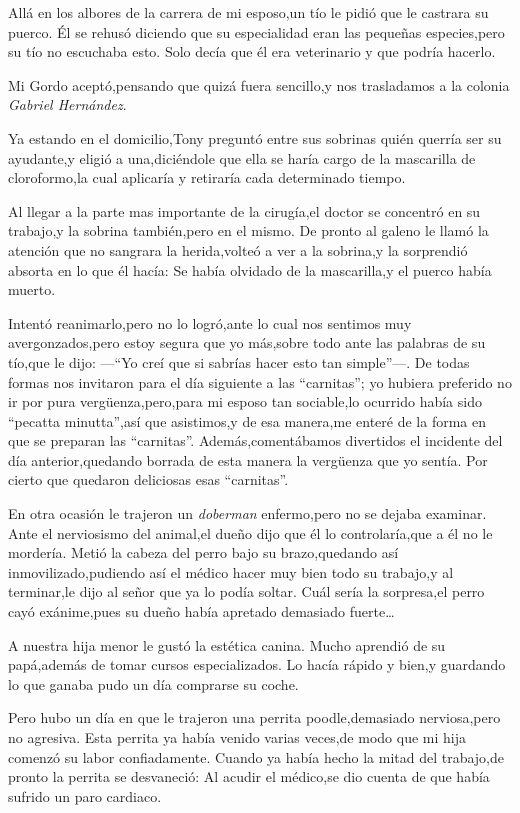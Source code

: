 \documentclass[letterpaper,12pt]{book}
\begin{document}
Allá en los albores de la carrera de mi esposo,un tío le pidió que le castrara su puerco. Él se rehusó diciendo que su especialidad eran las pequeñas especies,pero su tío no escuchaba esto. Solo decía que él era veterinario y que podría hacerlo.

Mi Gordo aceptó,pensando que quizá fuera sencillo,y nos trasladamos a la colonia {\it Gabriel Hernández}. 

Ya estando en el domicilio,Tony preguntó entre sus sobrinas quién querría ser su ayudante,y eligió a una,diciéndole que ella se haría cargo  de la mascarilla de cloroformo,la cual aplicaría y retiraría cada determinado tiempo.

Al llegar a la parte mas importante de la cirugía,el doctor se concentró en su trabajo,y la sobrina también,pero en el mismo. De pronto al galeno le llamó la atención que no sangrara la herida,volteó a ver a la sobrina,y la sorprendió absorta en lo que él hacía: Se había olvidado de la mascarilla,y el puerco había muerto.

Intentó reanimarlo,pero no lo logró,ante lo cual nos sentimos muy avergonzados,pero estoy segura que yo más,sobre todo ante las palabras de su tío,que le dijo: ---``Yo creí que si sabrías hacer esto tan simple''---. De todas formas nos invitaron para el día siguiente a las ``carnitas''; yo hubiera preferido no ir por pura vergüenza,pero,para mi esposo tan sociable,lo ocurrido había sido ``pecatta minutta'',así que asistimos,y de esa manera,me enteré de la forma en que se preparan las ``carnitas''. Además,comentábamos divertidos el incidente del día anterior,quedando borrada de esta manera la vergüenza que yo sentía. Por cierto que quedaron deliciosas esas ``carnitas''.

En otra ocasión le trajeron un {\it doberman}\/ enfermo,pero no se dejaba examinar. Ante el nerviosismo del animal,el dueño dijo que él lo controlaría,que a él no le mordería. Metió la cabeza del perro bajo su brazo,quedando así inmovilizado,pudiendo así el médico hacer muy bien todo su trabajo,y al terminar,le dijo al señor que ya lo podía soltar. Cuál sería la sorpresa,el perro cayó exánime,pues su dueño había apretado demasiado fuerte\ldots


A nuestra hija menor le gustó la estética canina. Mucho aprendió de su papá,además de tomar cursos especializados. Lo hacía rápido y bien,y guardando lo que ganaba pudo un día comprarse su coche.

Pero hubo un día en que le trajeron una perrita poodle,demasiado nerviosa,pero no agresiva. Esta perrita ya había venido varias veces,de modo que mi hija comenzó su labor confiadamente. Cuando ya había hecho la mitad del trabajo,de pronto la perrita se desvaneció: Al acudir el médico,se dio cuenta de que había sufrido un paro cardiaco. 
\end{document}
